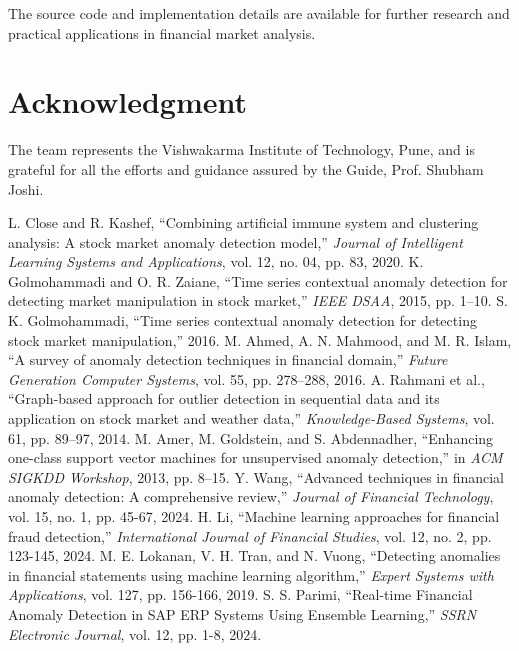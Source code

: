 \documentclass[conference]{IEEEtran}
\begin{document}
The source code and implementation details are available for further research and practical applications in financial market analysis.

\section*{Acknowledgment}
The team represents the Vishwakarma Institute of 
Technology, Pune, and is grateful for all the efforts and 
guidance assured by the Guide, Prof. Shubham Joshi. 

\begin{thebibliography}{00}
 L. Close and R. Kashef, ``Combining artificial immune system and clustering analysis: A stock market anomaly detection model,'' \textit{Journal of Intelligent Learning Systems and Applications}, vol. 12, no. 04, pp. 83, 2020.
 K. Golmohammadi and O. R. Zaiane, ``Time series contextual anomaly detection for detecting market manipulation in stock market,'' \textit{IEEE DSAA}, 2015, pp. 1–10.
 S. K. Golmohammadi, ``Time series contextual anomaly detection for detecting stock market manipulation,'' 2016.
 M. Ahmed, A. N. Mahmood, and M. R. Islam, ``A survey of anomaly detection techniques in financial domain,'' \textit{Future Generation Computer Systems}, vol. 55, pp. 278–288, 2016.
 A. Rahmani et al., ``Graph-based approach for outlier detection in sequential data and its application on stock market and weather data,'' \textit{Knowledge-Based Systems}, vol. 61, pp. 89–97, 2014.
 M. Amer, M. Goldstein, and S. Abdennadher, ``Enhancing one-class support vector machines for unsupervised anomaly detection,'' in \textit{ACM SIGKDD Workshop}, 2013, pp. 8–15.
 Y. Wang, ``Advanced techniques in financial anomaly detection: A comprehensive review,'' \textit{Journal of Financial Technology}, vol. 15, no. 1, pp. 45-67, 2024.
 H. Li, ``Machine learning approaches for financial fraud detection,'' \textit{International Journal of Financial Studies}, vol. 12, no. 2, pp. 123-145, 2024.
 M. E. Lokanan, V. H. Tran, and N. Vuong, ``Detecting anomalies in financial statements using machine learning algorithm,'' \textit{Expert Systems with Applications}, vol. 127, pp. 156-166, 2019.
 S. S. Parimi, ``Real-time Financial Anomaly Detection in SAP ERP Systems Using Ensemble Learning,'' \textit{SSRN Electronic Journal}, vol. 12, pp. 1-8, 2024.
\end{thebibliography}
\end{document}
